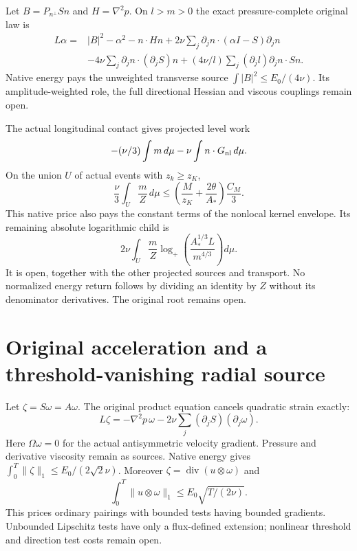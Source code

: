 \documentclass[11pt]{article}
\begin{document}
Let $B=P_{n^\perp}Sn$ and $H=\nabla^2p$. On $l>m>0$ the exact
pressure-complete original law is
\begin{align*}
 L\alpha={}&|B|^2-\alpha^2-n\cdot Hn
 +2\nu\sum_j\partial_jn\cdot(\alpha I-S)\partial_jn\\
 &-4\nu\sum_j\partial_jn\cdot(\partial_jS)n
 +(4\nu/l)\sum_j(\partial_jl)\partial_jn\cdot Sn.
\end{align*}
Native energy pays the unweighted transverse source
$\int|B|^2\le E_0/(4\nu)$. Its amplitude-weighted role, the full
directional Hessian and viscous couplings remain open.

The actual longitudinal contact gives projected level work
\[
 -(\nu/3)\int m\,d\mu-\nu\int n\cdot G_{\rm nl}\,d\mu.
\]
On the union $U$ of actual events with $z_k\ge z_K$,
\[
 \frac\nu3\int_U\frac mZ\,d\mu
 \le\left(\frac M{z_K}+\frac{2\theta}{A_*}\right)\frac{C_M}{3}.
\]
This native price also pays the constant terms of the nonlocal kernel
envelope. Its remaining absolute logarithmic child is
\[
 2\nu\int_U\frac mZ
       \log_+\!\left(\frac{A_*^{1/3}L}{m^{4/3}}\right)d\mu.
\]
It is open, together with the other projected sources and transport.
No normalized energy return follows by dividing an identity by $Z$
without its denominator derivatives. The original root remains open.

\section{Original acceleration and a threshold-vanishing radial source}
Let $\zeta=S\omega=A\omega$. The original product equation cancels
quadratic strain exactly:
\[
 L\zeta=-\nabla^2p\,\omega
       -2\nu\sum_j(\partial_jS)(\partial_j\omega).
\]
Here $\Omega\omega=0$ for the actual antisymmetric velocity gradient.
Pressure and derivative viscosity remain as sources. Native energy gives
$\int_0^T\|\zeta\|_1\le E_0/(2\sqrt2\nu)$. Moreover
$\zeta=\operatorname{div}(u\otimes\omega)$ and
\[
 \int_0^T\|u\otimes\omega\|_1
       \le E_0\sqrt{T/(2\nu)}.
\]
This prices ordinary pairings with bounded tests having bounded gradients.
Unbounded Lipschitz tests have only a flux-defined extension; nonlinear
threshold and direction test costs remain open.
\end{document}
